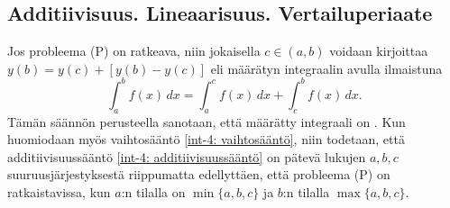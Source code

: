 \subsection{Additiivisuus. Lineaarisuus. Vertailuperiaate}

Jos probleema (P) on ratkeava, niin jokaisella $c\in(a,b)$ voidaan kirjoittaa
$y(b)=y(c)+[y(b)-y(c)]$ eli määrätyn integraalin avulla ilmaistuna
%
\begin{equation} \label{int-4: additiivisuussääntö}
\boxed{\quad \int_a^b f(x)\,dx = \int_a^c f(x)\,dx + \int_c^b f(x)\,dx. \quad}
\end{equation}
Tämän säännön perusteella sanotaan, että määrätty integraali on 
. Kun huomiodaan myös vaihtosääntö \eqref{int-4: vaihtosääntö},
niin todetaan, että additiivisuussääntö \eqref{int-4: additiivisuussääntö} on pätevä lukujen
$a,b,c$ suuruusjärjestyksestä riippumatta edellyttäen, että probleema (P) on ratkaistavissa,
kun $a$:n tilalla on $\min\{a,b,c\}$ ja $b$:n tilalla $\max\{a,b,c\}$.

